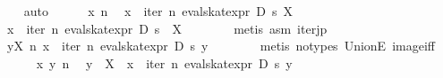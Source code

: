 \begin{isabellebody}
\ \ \isamarkupfalse%
\ auto\isanewline
\ \ \ \ \isamarkupfalse%
\ x\ n\ \isamarkupfalse%
\ {}x\ {}\ iter\ n\ {}eval{}skat{}expr\ D\ s{}\ {}{}X{}{}\isanewline
\ \ \ \ \isamarkupfalse%
\ {}x\ {}\ {}{}iter\ n\ {}eval{}skat{}expr\ D\ s{}\ {}\ X{}{}\isanewline
\ \ \ \ \ \ \isamarkupfalse%
\ {}metis\ asm\ iter{}jp{}\isanewline
\ \ \ \ \isamarkupfalse%
\ {}{}y{}X{}\ {}n{}\ x\ {}\ iter\ n\ {}eval{}skat{}expr\ D\ s{}\ y{}\isanewline
\ \ \ \ \ \ \isamarkupfalse%
\ {}metis\ {}no{}types{}\ UnionE\ image{}iff{}\isanewline
\ \ \isamarkupfalse%
\isanewline
\ \ \ \ \isamarkupfalse%
\ x\ y\ n\ \isamarkupfalse%
\ {}y\ {}\ X{}\ \ {}x\ {}\ iter\ n\ {}eval{}skat{}expr\ D\ s{}\ y{}\isanewline

\end{isabellebody}
